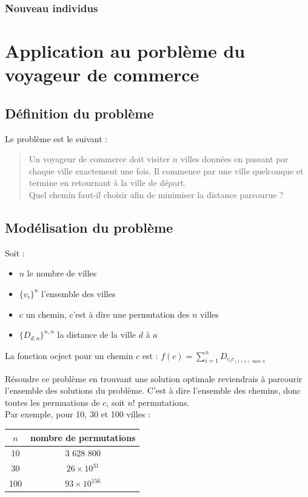 \documentclass{article}
\begin{document}
		\subsubsection{Nouveau individus}

\section{Application au porblème du voyageur de commerce}
	\subsection{Définition du problème}
	Le problème est le suivant : 
	\begin{quote}
	Un voyageur de commerce doit visiter $n$ villes données en passant par chaque ville exactement une fois. Il commence par une ville quelconque et termine en retournant à la ville de départ.\\
	Quel chemin faut-il choisir afin de minimiser la distance parcourue ?
	\end{quote}
	
	\subsection{Modélisation du problème}
    Soit :
    \begin{itemize}
        \item $n$ le nombre de villes
        \item $\{v_{i}\}^{n}$ l'ensemble des villes
        \item $c$ un chemin, c'est à dire une permutation des $n$ villes
        \item $\{D_{d, a}\}^{n, n}$ la distance de la ville $d$ à $a$
    \end{itemize}
    La fonction ocject pour un chemin $c$ est : $f(c) = \sum_{i=1}^{n}D_{ c_i c_{(i+1) \bmod n } }$

	Résoudre ce problème en trouvant une solution optimale reviendrais à parcourir l'ensemble des solutions du problème. C'est à dire l'ensemble des chemins, donc toutes les permuations de $c$, soit $n!$ permutations. \\
	Par exemple, pour 10, 30 et 100 villes : \\
	\begin{tabular}{cc}
	\hline
	$n$ & nombre de permutations \\
	\hline
	10 & 3 628 800 \\
	30 & $26 \times 10^{31}$ \\
	100 & $93 \times 10^{156}$ \\
	\hline
	\end{tabular}
\end{document}
